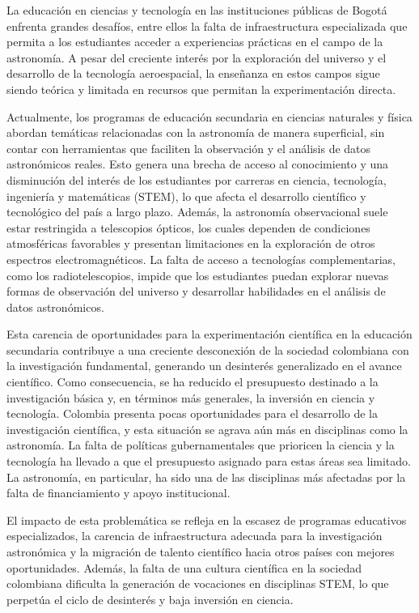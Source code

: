 La educación en ciencias y tecnología en las instituciones públicas de Bogotá
enfrenta grandes desafíos, entre ellos la falta de infraestructura especializada
que permita a los estudiantes acceder a experiencias prácticas en el campo de la
astronomía. A pesar del creciente interés por la exploración del universo y el
desarrollo de la tecnología aeroespacial, la enseñanza en estos campos sigue
siendo teórica y limitada en recursos que permitan la experimentación directa.

Actualmente, los programas de educación secundaria en ciencias naturales
y física abordan temáticas relacionadas con la astronomía de manera superficial,
sin contar con herramientas que faciliten la observación y el análisis de datos
astronómicos reales. Esto genera una brecha de acceso al conocimiento y una
disminución del interés de los estudiantes por carreras en ciencia, tecnología,
ingeniería y matemáticas (STEM), lo que afecta el desarrollo científico
y tecnológico del país a largo plazo. Además, la astronomía observacional suele
estar restringida a telescopios ópticos, los cuales dependen de condiciones
atmosféricas favorables y presentan limitaciones en la exploración de otros
espectros electromagnéticos. La falta de acceso a tecnologías complementarias,
como los radiotelescopios, impide que los estudiantes puedan explorar nuevas
formas de observación del universo y desarrollar habilidades en el análisis de
datos astronómicos.

Esta carencia de oportunidades para la experimentación científica en la
educación secundaria contribuye a una creciente desconexión de la sociedad
colombiana con la investigación fundamental, generando un desinterés
generalizado en el avance científico. Como consecuencia, se ha reducido el
presupuesto destinado a la investigación básica y, en términos más generales, la
inversión en ciencia y tecnología. Colombia presenta pocas oportunidades para el
desarrollo de la investigación científica, y esta situación se agrava aún más en
disciplinas como la astronomía. La falta de políticas gubernamentales que
prioricen la ciencia y la tecnología ha llevado a que el presupuesto asignado
para estas áreas sea limitado. La astronomía, en particular, ha sido una de las
disciplinas más afectadas por la falta de financiamiento y apoyo institucional.

El impacto de esta problemática se refleja en la escasez de programas educativos
especializados, la carencia de infraestructura adecuada para la investigación
astronómica y la migración de talento científico hacia otros países con mejores
oportunidades. Además, la falta de una cultura científica en la sociedad
colombiana dificulta la generación de vocaciones en disciplinas STEM, lo que
perpetúa el ciclo de desinterés y baja inversión en ciencia.

